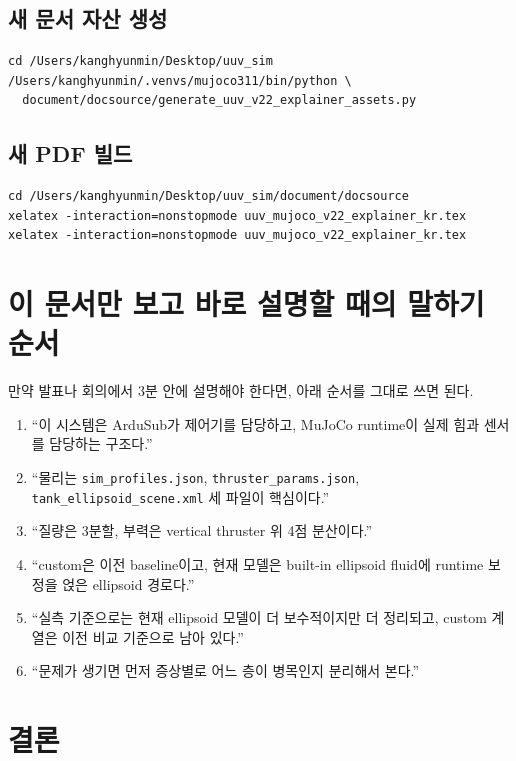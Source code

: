 \documentclass[11pt,a4paper]{article}
\newcommand{\code}[1]{\nolinkurl{#1}}
\begin{document}
\subsection{새 문서 자산 생성}

\begin{verbatim}
cd /Users/kanghyunmin/Desktop/uuv_sim
/Users/kanghyunmin/.venvs/mujoco311/bin/python \
  document/docsource/generate_uuv_v22_explainer_assets.py
\end{verbatim}

\subsection{새 PDF 빌드}

\begin{verbatim}
cd /Users/kanghyunmin/Desktop/uuv_sim/document/docsource
xelatex -interaction=nonstopmode uuv_mujoco_v22_explainer_kr.tex
xelatex -interaction=nonstopmode uuv_mujoco_v22_explainer_kr.tex
\end{verbatim}

\section{이 문서만 보고 바로 설명할 때의 말하기 순서}

만약 발표나 회의에서 3분 안에 설명해야 한다면, 아래 순서를 그대로 쓰면 된다.

\begin{enumerate}[leftmargin=2em]
  \item ``이 시스템은 ArduSub가 제어기를 담당하고, MuJoCo runtime이 실제 힘과 센서를 담당하는 구조다.''
  \item ``물리는 \code{sim\_profiles.json}, \code{thruster\_params.json}, \code{tank\_ellipsoid\_scene.xml} 세 파일이 핵심이다.''
  \item ``질량은 3분할, 부력은 vertical thruster 위 4점 분산이다.''
  \item ``custom은 이전 baseline이고, 현재 모델은 built-in ellipsoid fluid에 runtime 보정을 얹은 ellipsoid 경로다.''
  \item ``실측 기준으로는 현재 ellipsoid 모델이 더 보수적이지만 더 정리되고, custom 계열은 이전 비교 기준으로 남아 있다.''
  \item ``문제가 생기면 먼저 증상별로 어느 층이 병목인지 분리해서 본다.''
\end{enumerate}

\section{결론}
\end{document}

